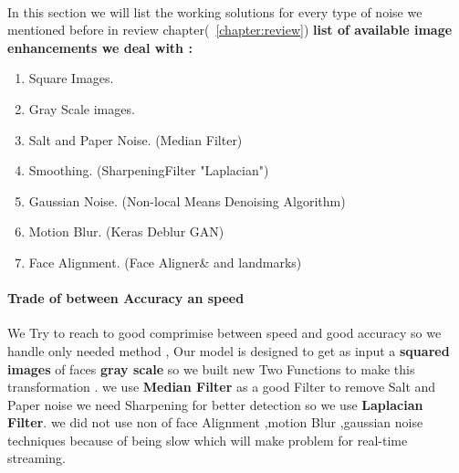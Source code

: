 \paragraph{}
In this section we will list the working solutions for every type of noise we mentioned before in review chapter(~\ref{chapter:review})\newline
\textbf{list of available image enhancements  we deal with :}
\begin{enumerate}
	\item Square Images.
	\item Gray Scale images.
	\item Salt and Paper Noise. (Median Filter)
	\item Smoothing. (SharpeningFilter "Laplacian")
	\item Gaussian Noise. (Non-local Means Denoising Algorithm)
	\item Motion Blur. (Keras Deblur GAN)
	\item Face Alignment. (Face Aligner\& and landmarks)	
\end{enumerate}
\paragraph{Trade of between Accuracy an speed }
We Try to reach to good comprimise between speed and good accuracy so we handle only needed method ,
Our model is designed to get as input a \textbf{squared images} of faces \textbf{gray scale} so we built new Two Functions to make this transformation . 
we use \textbf{Median Filter} as a good Filter to remove Salt and Paper noise we need Sharpening for better detection so we use \textbf{Laplacian Filter}.
we did not use non of face Alignment ,motion Blur ,gaussian noise techniques because of being slow which will make problem for real-time streaming.
